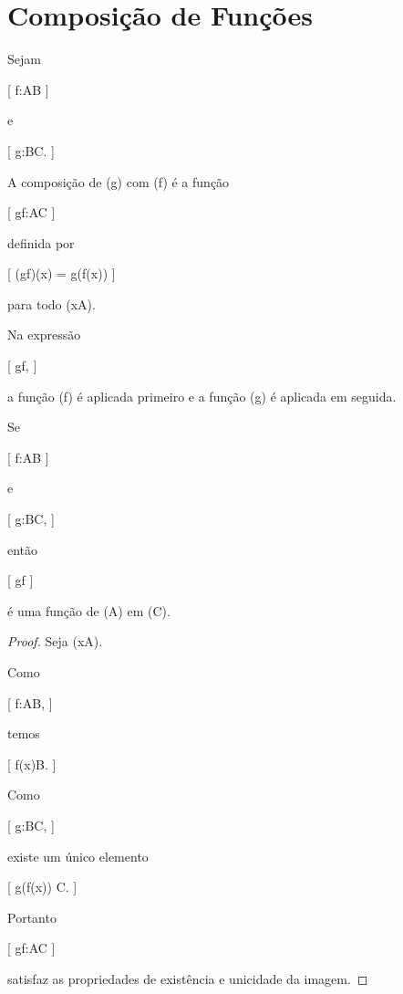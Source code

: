 \documentclass[../../main]{subfiles}
\begin{document}
\section{Composição de Funções}
\label{sec:matematica:funcoes:composicao}

\begin{defn}
	\label{def:matematica:funcoes:composicao:composicao}

	Sejam

		[
			f:A\to B
		]

	e

		[
			g:B\to C.
		]

	A composição de (g) com (f) é a função

	[
	g\circ f:A\to C
	]

	definida por

		[
			(g\circ f)(x)
			=
			g(f(x))
		]

	para todo (x\in A).

\end{defn}

\begin{obs}

	Na expressão

	[
	g\circ f,
	]

	a função (f) é aplicada primeiro e a função (g) é aplicada em
	seguida.

\end{obs}

\begin{prop}
	\label{prop:matematica:funcoes:composicao:boa-definicao}

	Se

		[
			f:A\to B
		]

	e

		[
			g:B\to C,
		]

	então

	[
	g\circ f
	]

	é uma função de (A) em (C).

\end{prop}

\begin{proof}

	Seja (x\in A).

	Como

		[
			f:A\to B,
		]

	temos

		[
			f(x)\in B.
		]

	Como

		[
			g:B\to C,
		]

	existe um único elemento

		[
			g(f(x))
			\in
			C.
		]

	Portanto

		[
			g\circ f:A\to C
		]

	satisfaz as propriedades de existência e unicidade da imagem.

\end{proof}
\end{document}
